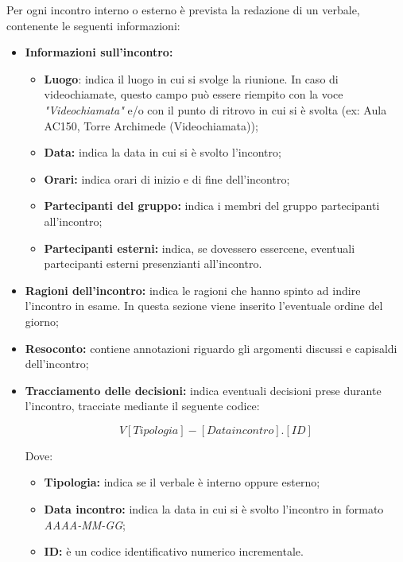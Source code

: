 \documentclass[../NormediProgetto.tex]{subfiles}
\begin{document}
Per ogni incontro interno o esterno è prevista la redazione di un verbale, contenente le seguenti informazioni:
\begin{itemize}
	\item \textbf{Informazioni sull'incontro:}
	\begin{itemize}
		\item \textbf{Luogo}: indica il luogo in cui si svolge la riunione. In caso di videochiamate, questo campo può essere riempito con la voce \textit{"Videochiamata"} e/o con il punto di ritrovo in cui si è svolta (ex: Aula AC150, Torre Archimede (Videochiamata));
		\item \textbf{Data:} indica la data in cui si è svolto l'incontro;
		\item \textbf{Orari:} indica orari di inizio e di fine dell'incontro;
		\item \textbf{Partecipanti del gruppo:} indica i membri del gruppo partecipanti all'incontro;
		\item \textbf{Partecipanti esterni:} indica, se dovessero essercene, eventuali partecipanti esterni presenzianti all'incontro.
	\end{itemize}
	
	\item \textbf{Ragioni dell'incontro:} indica le ragioni che hanno spinto ad indire l'incontro in esame. In questa sezione viene inserito l'eventuale ordine del giorno;
	
	\item \textbf{Resoconto:} contiene annotazioni riguardo gli argomenti discussi e capisaldi dell'incontro;
	
	\item \textbf{Tracciamento delle decisioni:} indica eventuali decisioni prese durante l'incontro, tracciate mediante il seguente codice:
	
	\[V[Tipologia]-[Data incontro].[ID]\]
	
	Dove:
	
	\begin{itemize}
		\item \textbf{Tipologia:} indica se il verbale è interno oppure esterno;
		\item \textbf{Data incontro:} indica la data in cui si è svolto l'incontro in formato \textit{AAAA-MM-GG};
		\item \textbf{ID:} è un codice identificativo numerico incrementale.
	\end{itemize}
	
\end{itemize}
\end{document}
